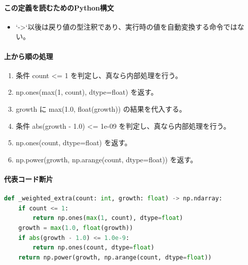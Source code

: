 \documentclass[a4paper,11pt]{article}
\begin{document}
            \paragraph{この定義を読むためのPython構文}
            \begin{itemize}[leftmargin=1.6em]
            \item `->`以後は戻り値の型注釈であり、実行時の値を自動変換する命令ではない。
            \end{itemize}
            \paragraph{上から順の処理}
            \begin{enumerate}[leftmargin=1.8em]
            \item 条件 count <= 1 を判定し、真なら内部処理を行う。
\item   np.ones(max(1, count), dtype=float) を返す。
\item growth に max(1.0, float(growth)) の結果を代入する。
\item 条件 abs(growth - 1.0) <= 1e-09 を判定し、真なら内部処理を行う。
\item   np.ones(count, dtype=float) を返す。
\item np.power(growth, np.arange(count, dtype=float)) を返す。
            \end{enumerate}
            \paragraph{代表コード断片}
            \begin{lstlisting}[language=Python]
def _weighted_extra(count: int, growth: float) -> np.ndarray:
    if count <= 1:
        return np.ones(max(1, count), dtype=float)
    growth = max(1.0, float(growth))
    if abs(growth - 1.0) <= 1.0e-9:
        return np.ones(count, dtype=float)
    return np.power(growth, np.arange(count, dtype=float))
\end{lstlisting}
\end{document}
